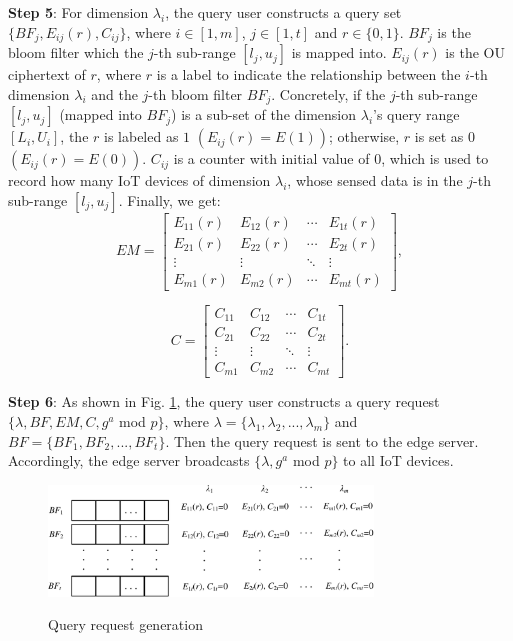 \documentclass[IEEE JOURNAL OF BIOMEDICAL AND HEALTH INFORMATICS]{IEEEtran}
\begin{document}
\textbf{Step 5}: For dimension $\lambda_i$, the query user constructs a query set $\{BF_j, E_{ij}(r), C_{ij}\}$, where $i\in [1, m]$, $j \in [1, t]$ and $r \in \{0, 1\}$. $BF_j$ is the bloom filter which the $j$-th sub-range $[l_j, u_j]$ is mapped into. $E_{ij}(r)$ is the OU ciphertext of $r$, where $r$ is a label to indicate the relationship between the $i$-th dimension $\lambda_i$ and the $j$-th bloom filter $BF_j$. Concretely, if the $j$-th sub-range $[l_j, u_j]$ (mapped into $BF_j$) is a sub-set of the dimension $\lambda_i$'s query range $[L_i, U_i]$, the $r$ is labeled as $1$ $(E_{ij}(r)=E(1))$; otherwise, $r$ is set as $0$ $(E_{ij}(r)=E(0))$.  $C_{ij}$ is a counter with initial value of $0$, which is used to record how many IoT devices of dimension $\lambda_i$, whose sensed data is in the $j$-th sub-range $[l_j, u_j]$. Finally, we get:
	$$EM = {\left [\begin{array}{cccc}
					E_{11}(r) & E_{12}(r) & \cdots & E_{1t}(r)\\
					E_{21}(r) & E_{22}(r) & \cdots & E_{2t}(r)\\
					\vdots    & \vdots    & \ddots & \vdots\\
					E_{m1}(r) & E_{m2}(r) & \cdots & E_{mt}(r)  
					\end{array} \right] },$$
				
	$$C= \left [
		\begin{array}{cccc}
			C_{11} & C_{12} & \cdots & C_{1t}\\
			C_{21} & C_{22} & \cdots & C_{2t}\\
			\vdots & \vdots  & \ddots & \vdots\\
			C_{m1} & C_{m2} & \cdots & C_{mt}
		\end{array}	
		\right].$$
		
\textbf{Step 6}: As shown in Fig. \ref{query request}, the query user constructs a query request $\{\lambda, BF, EM, C, g^a$ mod $p\}$, where $\lambda=\{\lambda_1, \lambda_2, ..., \lambda_m\}$ and $BF=\{BF_1, BF_2, ..., BF_t\}$. Then the query request is sent to the edge server. Accordingly, the edge server broadcasts $\{\lambda,  g^a$ mod $p\}$ to all IoT devices. 

	\begin{figure}
		\centering
		\includegraphics[width=3.4in]{query_request_model}\\
		\caption{Query request generation}\label{query request}
	\end{figure}
	
\end{document}
